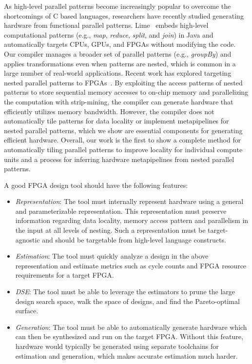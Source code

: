 As high-level parallel patterns become increasingly popular to overcome the
shortcomings of C based languages, researchers have recently studied generating
hardware from functional parallel patterns.  Lime~\cite{auerbach10lime}
embeds high-level computational patterns (e.g., \emph{map}, \emph{reduce}, \emph{split}, and \emph{join}) in
Java and automatically targets CPUs, GPUs, and FPGAs without modifying the
code.  Our compiler manages a broader set of parallel patterns (e.g., \emph{groupBy})
and applies transformations even when patterns are nested,
which is common in a large number of real-world applications.  Recent work has
explored targeting nested parallel patterns to
FPGAs~\cite{george14fpl}. By exploiting the access patterns of nested patterns
to store sequential memory accesses to on-chip memory and parallelizing the
computation with strip-mining, the compiler can generate hardware that
efficiently utilizes memory bandwidth.  However, the compiler does not
automatically tile patterns for data locality or implement metapipelines
for nested parallel patterns, which we show are essential components for generating efficient hardware. Overall, our work is the first to show a complete method for
automatically tiling parallel patterns to improve locality for individual compute units and a process
for inferring hardware metapipelines from nested parallel patterns.


A good FPGA design tool should have the following features:
\begin{itemize}
  \item \emph{Representation}: The tool must internally represent hardware using a general and parameterizable
    representation. This representation must preserve information regarding data locality,
    memory access pattern and parallelism in the input at all levels of nesting.
    Such a representation must be target-agnostic and should be targetable from high-level
    language constructs.
  \item \emph{Estimation}: The tool must quickly analyze a design in the above representation
    and estimate metrics such as cycle counts and FPGA resource requirements for a target FPGA.
  \item \emph{DSE}: The tool must be able to leverage the estimators to prune the large design search space,
    walk the space of designs, and find the Pareto-optimal surface.
  \item \emph{Generation}: The tool must be able to automatically generate hardware which can then be
    synthesized and run on the target FPGA. Without this feature, hardware would typically
    be generated using separate toolchains for estimation and generation, which makes
    accurate estimation much harder.
\end{itemize}

